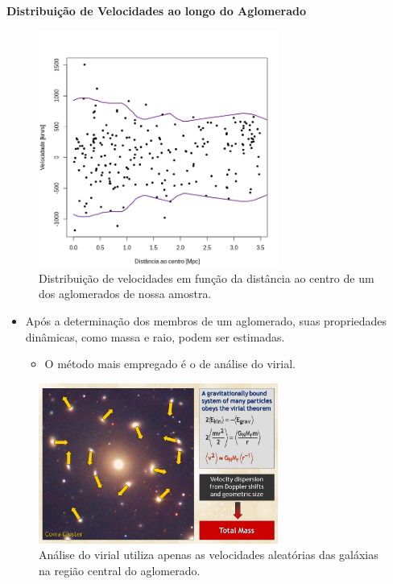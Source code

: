 \documentclass[xcolor=dvipsnames,10pt]{beamer}
\begin{document}
\begin{frame}{\textbf{Distribuição de Velocidades ao longo do Aglomerado}}
  \begin{figure}[!htbp] %
    \begin{center}
    \includegraphics[height=0.6\textheight,width=0.7\textwidth]{10043}%
    \caption{\scriptsize{Distribuição de velocidades em função da distância ao centro de um dos aglomerados de nossa amostra.}}
    \label{fig1}%
    \end{center}
  \end{figure} 
\end{frame}

\begin{frame}
  \begin{itemize}
    \item Após a determinação dos membros de um aglomerado, suas propriedades dinâmicas, como massa e raio, podem ser estimadas.
    \begin{itemize}
      \item O método mais empregado é o de análise do virial.
    \end{itemize} 
  \end{itemize}
  \begin{figure}[!htbp] %
    \begin{center}
    \includegraphics[height=0.5\textheight,width=0.7\textwidth]{resultados/virial.jpg}%
    \caption{\scriptsize{Análise do virial utiliza apenas as velocidades aleatórias das galáxias na região central do aglomerado.}}
    \end{center}
  \end{figure} 
\end{frame}
\end{document}
